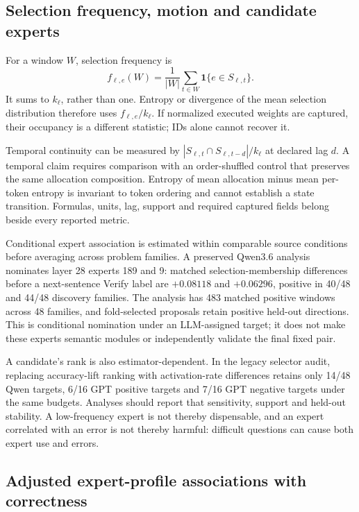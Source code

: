 \subsection{Selection frequency, motion and candidate experts}
For a window $W$, selection frequency is
\begin{equation}
f_{\ell,e}(W)=\frac{1}{|W|}\sum_{t\in W}
             \mathbf{1}\{e\in S_{\ell,t}\}.
\end{equation}
It sums to $k_\ell$, rather than one. Entropy or divergence of the mean
selection distribution therefore uses $f_{\ell,e}/k_\ell$.
If normalized executed weights are captured, their occupancy is a
different statistic; IDs alone cannot recover it.

Temporal continuity can be measured by
$|S_{\ell,t}\cap S_{\ell,t-d}|/k_\ell$ at declared lag $d$. A temporal claim
requires comparison with an order-shuffled control that preserves the
same allocation composition. Entropy of mean allocation minus mean
per-token entropy is invariant to token ordering and cannot establish a
state transition. Formulas, units, lag, support and required captured
fields belong beside every reported metric.

Conditional expert association is estimated within comparable source
conditions before averaging across problem families. A preserved
Qwen3.6 analysis nominates layer 28 experts 189 and 9: matched
selection-membership differences before a next-sentence Verify label are
$+0.08118$ and $+0.06296$, positive in 40/48 and 44/48 discovery families.
The analysis has 483 matched positive windows across 48 families, and
fold-selected proposals retain positive held-out directions. This is
conditional nomination under an LLM-assigned target; it does not make
these experts semantic modules or independently validate the final fixed
pair.

A candidate's rank is also estimator-dependent. In the legacy selector
audit, replacing accuracy-lift ranking with activation-rate differences
retains only 14/48 Qwen targets, 6/16 GPT positive targets and 7/16 GPT
negative targets under the same budgets. Analyses should report that
sensitivity, support and held-out stability. A low-frequency expert is
not thereby dispensable, and an expert correlated with an error is not
thereby harmful: difficult questions can cause both expert use and errors.

\subsection{Adjusted expert-profile associations with correctness}
\label{sec:adjusted-expert-associations}

